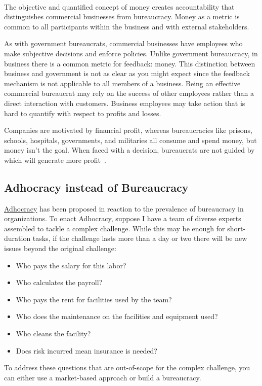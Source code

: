 \ \\

The objective and quantified concept of money creates accountability that distinguishes commercial businesses from bureaucracy. Money as a metric is common to all participants within the business and with external stakeholders. 

As with government bureaucrats, commercial businesses have employees who make subjective decisions and enforce policies. Unlike government bureaucracy, in business there is a common metric for feedback: money. This distinction between business and government is not as clear as you might expect since the feedback mechanism is not applicable to all members of a business. Being an effective commercial bureaucrat may rely on the success of other employees rather than a direct interaction with customers. Business employees may take action that is hard to quantify with respect to profits and losses.

Companies are motivated by financial profit, whereas bureaucracies like prisons, schools, hospitals, governments, and militaries all consume and spend money, but money isn't the goal. When faced with a decision, bureaucrats are not guided by which will generate more profit~\cite{2012_Wilson}.

\subsection*{Adhocracy instead of Bureaucracy}

\href{https://en.wikipedia.org/wiki/Adhocracy}{Adhocracy} 
has been proposed in reaction to the prevalence of bureaucracy in organizations. To enact Adhocracy, suppose I have a team of diverse experts assembled to tackle a complex challenge.
While this may be enough for short-duration tasks, if the challenge lasts more than a day or two there will be new issues beyond the original challenge:

\begin{itemize}
    \item Who pays the salary for this labor?
    \item Who calculates the payroll?
    \item Who pays the rent for facilities used by the team?
    \item Who does the maintenance on the facilities and equipment used?
    \item Who cleans the facility?
    \item Does risk incurred mean insurance is needed?
\end{itemize}
To address these questions that are out-of-scope for the complex challenge, you can either use a market-based approach or build a bureaucracy. 

